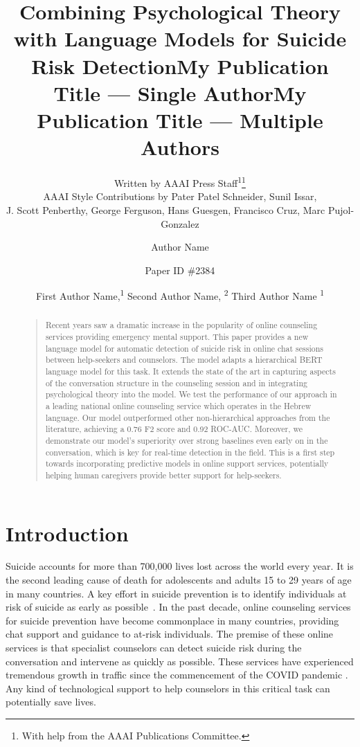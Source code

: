 \documentclass[letterpaper]{article} %
\title{Combining Psychological Theory with Language Models for  Suicide Risk Detection}
\author{
    Written by AAAI Press Staff\textsuperscript{\rm 1}\thanks{With help from the AAAI Publications Committee.}\\
    AAAI Style Contributions by Pater Patel Schneider,
    Sunil Issar,\\
    J. Scott Penberthy,
    George Ferguson,
    Hans Guesgen,
    Francisco Cruz\equalcontrib,
    Marc Pujol-Gonzalez\equalcontrib
}
\title{My Publication Title --- Single Author}
\author {
    Author Name
}
\author{Paper ID \#2384}
\title{My Publication Title --- Multiple Authors}
\author {
    First Author Name,\textsuperscript{\rm 1}
    Second Author Name, \textsuperscript{\rm 2}
    Third Author Name \textsuperscript{\rm 1}
}
\begin{document}
\maketitle
 
\maketitle
\begin{abstract}
\begin{quote}
Recent years saw a dramatic increase in the popularity of online counseling services providing emergency mental support.
This paper provides a new language model for automatic detection of suicide risk in online chat sessions between help-seekers and counselors. 
The model adapts a hierarchical BERT language model for this task. It  extends the state of the art in capturing aspects of the conversation structure in the counseling  session and  in 
integrating psychological theory into the model.
We test the performance of our approach in a leading national online counseling service which operates in the Hebrew language.  
Our model outperformed other non-hierarchical approaches from the literature, achieving a 0.76 F2 score and  0.92 ROC-AUC.  Moreover, we demonstrate our model’s superiority over strong baselines even early on in the conversation, which is key for real-time detection in the field.
This is a first step towards incorporating predictive models in online support services, potentially helping human caregivers provide better support for help-seekers.  

\end{quote}
\end{abstract}

\section{Introduction}
Suicide  accounts for more than 700,000 lives lost across the world every year. It is the second leading cause of death for adolescents and adults 15 to 29 years of age in many countries.   A  key effort in suicide prevention is to  identify individuals at risk of suicide as early as possible~\cite{world2021live}. 
In the past decade, online counseling services for  suicide prevention have become commonplace in many countries, providing chat support and guidance to at-risk individuals.  The premise of these online services is that specialist counselors can  detect suicide risk during the conversation and intervene as quickly as possible.   These services have experienced tremendous growth in traffic since the commencement of the  COVID pandemic \cite{zalsman2021suicide}. Any kind of technological support to help counselors in this critical task can potentially save lives.
\end{document}
